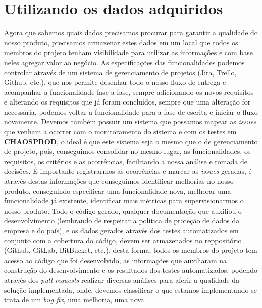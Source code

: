     \section{Utilizando os dados adquiridos}
      Agora que sabemos quais dados precisamos procurar para garantir a qualidade
      do nosso produto, precisamos armazenar estes dados em um local que todos os
      membros do projeto tenham visibilidade para utilizar as informações e com
      base neles agregar valor ao negócio. As especificações das funcionalidades
      podemos controlar através de um sistema de gerenciamento de projetos (Jira,
      Trello, Github, etc.), que nos permite desenhar todo o nosso fluxo de entrega e
      acompanhar a funcionalidade fase a fase, sempre adicionando os novos requisitos
      e alterando os requisitos que já foram concluídos, sempre que uma alteração
      for necessária, podemos voltar a funcionalidade para a fase de escrita e
      iniciar o fluxo novamente. Devemos também possuir um sistema que possamos
      mapear as \textit{issues} que venham a ocorrer com o monitoramento do sistema
      e com os testes em \textbf{CHAOSPROD}, o ideal é que este sistema seja o
      mesmo que o de gerenciamento de projeto, pois, conseguimos consolidar no
      mesmo lugar, as funcionalidades, os requisitos, os critérios e as
      ocorrências, facilitando a nossa análise e tomada de decisões. É importante
      registrarmos as ocorrências e marcar as \textit{issues} geradas, é
      através destas informações que conseguimos identificar melhorias no nosso
      produto, conseguindo especificar uma funcionalidade nova, melhorar uma
      funcionalidade já existente, identificar mais métricas para supervisionarmos
      o nosso produto. \newline
      Todo o código gerado, qualquer documentação que auxiliou o desenvolvimento
      (lembrando de respeitar a política de proteção de dados da empresa e do
      país), e os dados gerados através dos testes automatizados em conjunto
      com a cobertura do código, devem ser armazenados no reppositório (Github,
      GitLab, BitBucket, etc.), desta forma, todos os membros do projeto tem
      acesso ao código que foi desenvolvido, as informações que auxiliaram na
      construção do desenvolvimento e os resultados dos testes automatizados,
      podendo através dos \textit{pull requests} realizar diversas análises para
      aferir a qualidade da solução implementada, onde, devemos classificar o que
      estamos implementando se trata de um \textit{bug fix}, uma melhoria, uma nova
